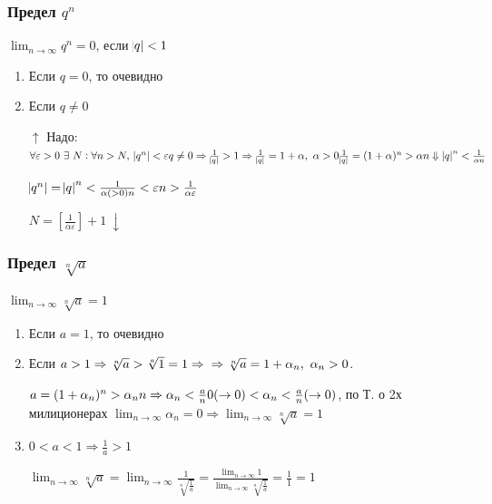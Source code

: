 \documentclass{article}
\begin{document}
    \subsubsection{Предел \(q^n\)}
    
    \(\lim_{n \rightarrow \infty}{q^n} = 0\), если \(\abs{q} < 1\)
        
        \begin{enumerate}
        	\item Если \(q = 0\), то очевидно
            
            \item Если \(q \not = 0\)
            
            \(\uparrow\) Надо: \(\forall \varepsilon > 0\ \exists\ N : \forall n > N,\ \abs{q^n} < \varepsilon
            \\ q \not = 0 \Rightarrow \frac{1}{\abs{q}} > 1 \Rightarrow \frac{1}{\abs{q}} = 1 + \alpha,\ \alpha > 0\\
            \frac{1}{\abs{q}} = (1 + \alpha)^n > \alpha n\\ \Downarrow\\ \abs{q}^n < \frac{1}{\alpha n}\)
            
            \(\abs{q^n} = \abs{q}^n < \frac{1}{\alpha(> 0) n} < \varepsilon\\ n > \frac{1}{\alpha \varepsilon}\)
            
            \(N = [\frac{1}{\alpha \varepsilon}] + 1\ \downarrow\)
        \end{enumerate}
        
    \subsubsection{Предел \(\sqrt[n]{a}\)}
        
        \(\lim_{n \rightarrow \infty}{\sqrt[n]{a}} = 1\)
        \begin{enumerate}
        	\item Если \(a = 1\), то очевидно
            
            \item Если \(a > 1 \Rightarrow \sqrt[n]{a} > \sqrt[a]{1} = 1 \Rightarrow\\
            \Rightarrow \sqrt[n]{a} = 1 + \alpha_n,\ \alpha_n > 0\).
            
            \(a = (1 + \alpha_n)^n > \alpha_n n \Rightarrow \alpha_n < \frac{a}{n}\\
            0(\rightarrow 0) < \alpha_n < \frac{a}{n}(\rightarrow 0)\), по Т. о 2х милиционерах \(\lim_{n \rightarrow \infty}{\alpha_n} = 0 \Rightarrow \lim_{n \rightarrow \infty}{\sqrt[n]{a}} = 1\)
            
            \item \(0 < a < 1 \Rightarrow \frac{1}{a} > 1\)
            
            \(\lim_{n \rightarrow \infty}{\sqrt[n]{a}} = \lim_{n \rightarrow \infty}{\frac{1}{\sqrt[n]{\frac{1}{a}}}} = \frac{\lim_{n \rightarrow \infty}{1}}{\lim_{n \rightarrow \infty}{\sqrt[n]{\frac{1}{a}}}}
            = \frac{1}{1} = 1\)
        \end{enumerate}
        
\end{document}
